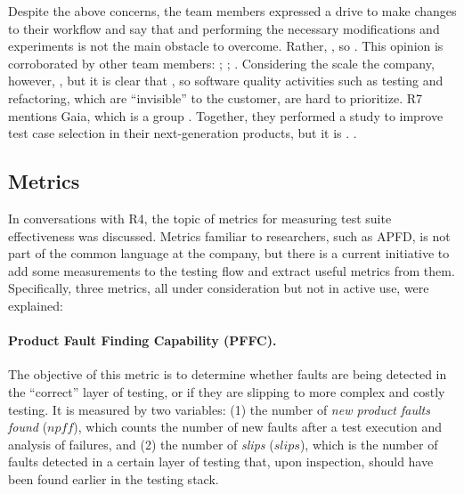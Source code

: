 Despite the above concerns, the team members expressed a drive to make changes to their workflow and say that  and performing the necessary modifications and experiments is not the main obstacle to overcome.
Rather, , so .
This opinion is corroborated by other team members: ; ; .
Considering the scale the company, however, , but it is clear that , so software quality activities such as testing and refactoring, which are ``invisible'' to the customer, are hard to prioritize.
R7 mentions Gaia, which is a group .
Together, they performed a study to improve test case selection in their next-generation products, but it is .
.

\subsection{Metrics}

In conversations with R4, the topic of metrics for measuring test suite effectiveness was discussed.
Metrics familiar to researchers, such as APFD, is not part of the common language at the company, but there is a current initiative to add some measurements to the testing flow and extract useful metrics from them.
Specifically, three metrics, all under consideration but not in active use, were explained:

\paragraph{Product Fault Finding Capability (PFFC).}
The objective of this metric is to determine whether faults are being detected in the ``correct'' layer of testing, or if they are slipping to more complex and costly testing.
It is measured by two variables: (1) the number of \textit{new product faults found} ($npff$), which counts the number of new faults after a test execution and analysis of failures, and (2) the number of \textit{slips} ($slips$), which is the number of faults detected in a certain layer of testing that, upon inspection, should have been found earlier in the testing stack.

